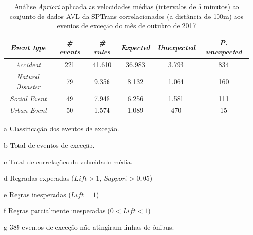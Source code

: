 \documentclass[
	12pt,				%
	oneside,			%
	a4paper,			%
	english,			%
	brazil				%
	]{abntex2ppgsi}
\begin{document}
{{\begin{apendicesenv}
\begin{table}[!htb]
\centering
\begin{threeparttable}
\caption {Análise \textit{Apriori} aplicada as velocidades médias (intervalos de 5 minutos) ao conjunto de dados AVL da SPTrans correlacionados (a distância de 100m) aos eventos de exceção do mês de outubro de 2017}
\label {tab:aprioriFull}
\begin{tabular}{c|c|c|c|c|c}
\hline
\textbf{\textit{Event type}}\tnote{a} & \textbf{\textit{\# events}}\tnote{b} & \textit{\textbf{\# rules}}\tnote{c} & \textbf{\textit{Expected}}\tnote{d} & \textbf{\textit{Unexpected}}\tnote{e} & \textbf{\textit{P. unexpected}}\tnote{f}   \\
\hline
\textit{Accident} & 221 & 41.610 & 36.983 & 3.793 & 834 \\
\textit{Natural Disaster} & 79 & 9.356 & 8.132 & 1.064 & 160 \\
\textit{Social Event} & 49 & 7.948 & 6.256 & 1.581 & 111 \\
\textit{Urban Event} & 50 & 1.574 & 1.089 & 470 & 15 \\
\hline
\end{tabular}
\begin{tablenotes}
            \item[a] Classificação dos eventos de exceção.
            \item[b] Total de eventos de exceção.
            \item[c] Total de correlações de velocidade média.
            \item[d] Regradas experadas ($Lift > 1$, $Support > 0,05$)
            \item[e] Regras inesperadas ($Lift = 1$)
            \item[f] Regras parcialmente inesperadas ($0 < Lift < 1$)
            \item[g] 389 eventos de exceção não atingiram linhas de ônibus.
        \end{tablenotes}
\end{threeparttable}
\end{table}


\end{apendicesenv}}}
\end{document}
